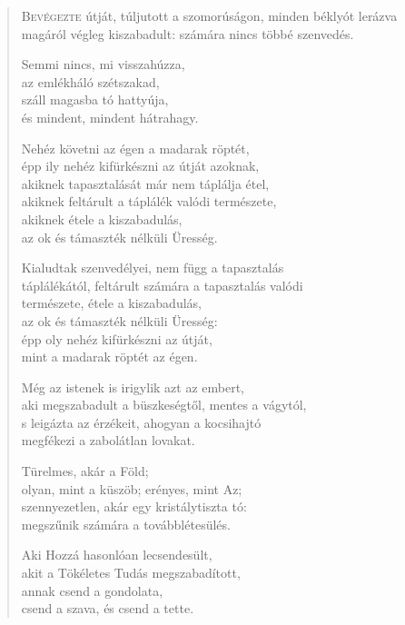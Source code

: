 
\begin{verse}

{\par%
\lettrine{B}{evégezte} {\LettrineTextFont útját, túljutott a szomorúságon,}\newline
minden béklyót lerázva magáról\newline
végleg kiszabadult:\verselinebreak
számára nincs többé szenvedés.
\par}

 Semmi nincs, mi visszahúzza,\\
az emlékháló szétszakad,\\
száll magasba tó hattyúja,\\
és mindent, mindent hátrahagy.

 Nehéz követni az égen a madarak röptét,\\
épp ily nehéz kifürkészni az útját azoknak,\\
akiknek tapasztalását már nem táplálja étel,\\
akiknek feltárult a táplálék valódi természete,\\
akiknek étele a kiszabadulás,\\
az ok és támaszték nélküli Üresség.

\newpage

 Kialudtak szenvedélyei, nem függ a tapasztalás\\
táplálékától, feltárult számára a tapasztalás valódi\\
természete, étele a kiszabadulás,\\
az ok és támaszték nélküli Üresség:\\
épp oly nehéz kifürkészni az útját,\\
mint a madarak röptét az égen.

 Még az istenek is irigylik azt az embert,\\
aki megszabadult a büszkeségtől, mentes a vágytól,\\
s leigázta az érzékeit, ahogyan a kocsihajtó\\
megfékezi a zabolátlan lovakat.

 Türelmes, akár a Föld;\\
olyan, mint a küszöb; erényes, mint Az;\\
szennyezetlen, akár egy kristálytiszta tó:\\
megszűnik számára a továbblétesülés.

 Aki Hozzá hasonlóan lecsendesült,\\
akit a Tökéletes Tudás megszabadított,\\
annak csend a gondolata,\\
csend a szava, és csend a tette.


\end{verse}
